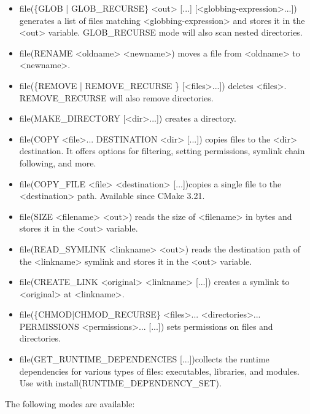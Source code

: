 \begin{itemize}
\item
file(\{GLOB | GLOB\_RECURSE\} <out> [...] [<globbing-expression>...]) generates a list of files matching <globbing-expression> and stores it in the <out> variable. GLOB\_RECURSE mode will also scan nested directories.

\item
file(RENAME <oldname> <newname>) moves a file from <oldname> to <newname>.

\item
file(\{REMOVE | REMOVE\_RECURSE \} [<files>...]) deletes <files>. REMOVE\_RECURSE will also remove directories.

\item
file(MAKE\_DIRECTORY [<dir>...]) creates a directory.

\item
file(COPY <file>... DESTINATION <dir> [...]) copies files to the <dir> destination. It offers options for filtering, setting permissions, symlink chain following, and more.

\item
file(COPY\_FILE <file> <destination> [...])copies a single file to the <destination> path. Available since CMake 3.21.

\item
file(SIZE <filename> <out>) reads the size of <filename> in bytes and stores it in the <out> variable.

\item
file(READ\_SYMLINK <linkname> <out>) reads the destination path of the <linkname> symlink and stores it in the <out> variable.

\item
file(CREATE\_LINK <original> <linkname> [...]) creates a symlink to <original> at <linkname>.

\item
file(\{CHMOD|CHMOD\_RECURSE\} <files>... <directories>... PERMISSIONS <permissions>... [...]) sets permissions on files and directories.

\item
file(GET\_RUNTIME\_DEPENDENCIES [...])collects the runtime dependencies for various types of files: executables, libraries, and modules. Use with install(RUNTIME\_DEPENDENCY\_SET).
\end{itemize}


The following modes are available:

